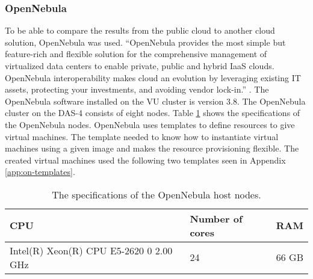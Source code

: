 \subsubsection{OpenNebula}
\label{hw:opennebula}
To be able to compare the results from the public cloud to another cloud solution, OpenNebula was used. 
``OpenNebula  provides the most simple but feature-rich and flexible solution for the comprehensive management of virtualized data centers to enable private, public and hybrid IaaS clouds. OpenNebula interoperability makes cloud an evolution by leveraging existing IT assets, protecting your investments, and avoiding vendor lock-in.'' \cite{opennebula}. The OpenNebula software installed on the VU cluster is version 3.8. The OpenNebula cluster on the DAS-4 consists of eight nodes. Table \ref{tab:specs-opennebula} shows the specifications of the OpenNebula nodes. OpenNebula uses templates to define resources to give virtual machines. The template needed to know how to instantiate virtual machines using a given image and makes the resource provisioning flexible. The created virtual machines used the following two templates seen in Appendix \ref{app:on-templates}.
\begin{table} [!h]
	\begin{center}
	\begin{tabular}{|l|l|l|}
		\hline
		CPU & Number of cores & RAM  \\ \hline
		Intel(R) Xeon(R) CPU E5-2620 0 2.00 GHz & 24 & 66 GB\\ \hline
	\end{tabular}
	\caption{The specifications of the OpenNebula host nodes.}
	\label{tab:specs-opennebula}
	\end{center}
\end{table}

